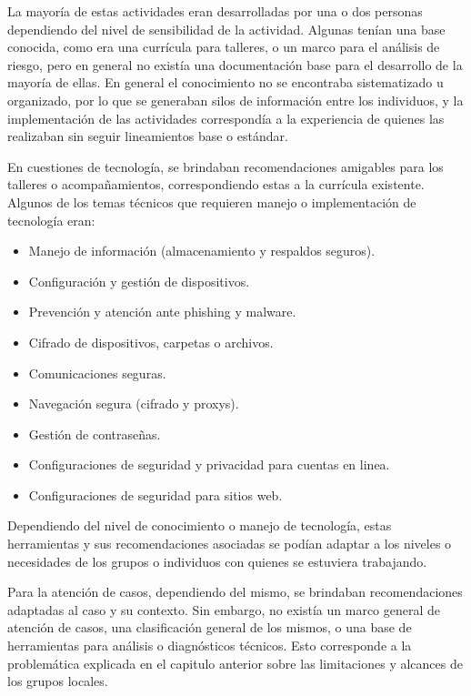 \documentclass[12pt]{caltech_thesis}
\begin{document}
La mayoría de estas actividades eran desarrolladas por una o dos personas dependiendo del nivel de sensibilidad de la actividad. Algunas tenían una base conocida, como era una currícula para talleres, o un marco para el análisis de riesgo, pero en general no existía una documentación base para el desarrollo de la mayoría de ellas. En general el conocimiento no se encontraba sistematizado u organizado, por lo que se generaban silos de información entre los individuos, y la implementación de las actividades correspondía a la experiencia de quienes las realizaban sin seguir lineamientos base o estándar.

En cuestiones de tecnología, se brindaban recomendaciones amigables para los talleres o acompañamientos, correspondiendo estas a la currícula existente. Algunos de los temas técnicos que requieren manejo o implementación de tecnología eran:

\begin{itemize}
    \item Manejo de información (almacenamiento y respaldos seguros).
    \item Configuración y gestión de dispositivos.
    \item Prevención y atención ante phishing y malware.
    \item Cifrado de dispositivos, carpetas o archivos.
    \item Comunicaciones seguras.
    \item Navegación segura (cifrado y proxys).
    \item Gestión de contraseñas.
    \item Configuraciones de seguridad y privacidad para cuentas en linea.
    \item Configuraciones de seguridad para sitios web.
\end{itemize}

Dependiendo del nivel de conocimiento o manejo de tecnología, estas herramientas y sus recomendaciones asociadas se podían adaptar a los niveles o necesidades de los grupos o individuos con quienes se estuviera trabajando.

Para la atención de casos, dependiendo del mismo, se brindaban recomendaciones adaptadas al caso y su contexto. Sin embargo, no existía un marco general de atención de casos, una clasificación general de los mismos, o una base de herramientas para análisis o diagnósticos técnicos. Esto corresponde a la problemática explicada en el capitulo anterior sobre las limitaciones y alcances de los grupos locales.
\end{document}
